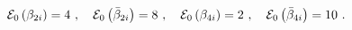 \begin{equation}\label{eng2}
{\cal E}_0\left( \beta_{2i}\right) = 4 ~,~~~
{\cal E}_0\left( \bar\beta_{2i}\right) = 8 ~,~~~
{\cal E}_0\left( \beta_{4i}\right) = 2 ~,~~~
{\cal E}_0\left( \bar\beta_{4i}\right) = 10~.
\end{equation}

